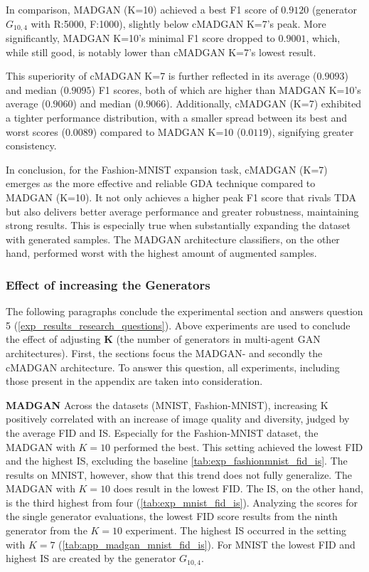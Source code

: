 In comparison, MADGAN (K=10) achieved a best F1 score of $0.9120$ (generator \(G_{10,4}\) with R:5000, F:1000), slightly below cMADGAN K=7's peak. More significantly, MADGAN K=10's minimal F1 score dropped to $0.9001$, which, while still good, is notably lower than cMADGAN K=7's lowest result.

This superiority of cMADGAN K=7 is further reflected in its average ($0.9093$) and median ($0.9095$) F1 scores, both of which are higher than MADGAN K=10's average ($0.9060$) and median ($0.9066$). Additionally, cMADGAN (K=7) exhibited a tighter performance distribution, with a smaller spread between its best and worst scores ($0.0089$) compared to MADGAN K=10 ($0.0119$), signifying greater consistency.

In conclusion, for the Fashion-MNIST expansion task, cMADGAN (K=7) emerges as the more effective and reliable GDA technique compared to MADGAN (K=10). It not only achieves a higher peak F1 score that rivals TDA but also delivers better average performance and greater robustness, maintaining strong results. This is especially true when substantially expanding the dataset with generated samples. The MADGAN architecture classifiers, on the other hand, performed worst with the highest amount of augmented samples.

\subsubsection[Question 5]{Effect of increasing the Generators}            \label{exp_results_ans_q5}
The following paragraphs conclude the experimental section and answers question 5 (\ref{exp_results_research_questions}). Above experiments are used to conclude the effect of adjusting \textbf{K} (the number of generators in multi-agent GAN architectures). First, the sections focus the MADGAN- and secondly the cMADGAN architecture. To answer this question, all experiments, including those present in the appendix are taken into consideration.


\noindent\textbf{MADGAN}
Across the datasets (MNIST, Fashion-MNIST), increasing K positively correlated with an increase of image quality and diversity, judged by the average FID and IS. Especially for the Fashion-MNIST dataset, the MADGAN with $K=10$ performed the best. This setting achieved the lowest FID and the highest IS, excluding the baseline \ref{tab:exp_fashionmnist_fid_is}. The results on MNIST, however, show that this trend does not fully generalize. The MADGAN with $K=10$ does result in the lowest FID. The IS, on the other hand, is the third highest from four (\ref{tab:exp_mnist_fid_is}). Analyzing the scores for the single generator evaluations, the lowest FID score results from the ninth generator from the $K=10$ experiment. The highest IS occurred in the setting with $K=7$ (\ref{tab:app_madgan_mnist_fid_is}). For MNIST the lowest FID and highest IS are created by the generator \(G_{10,4}\).

